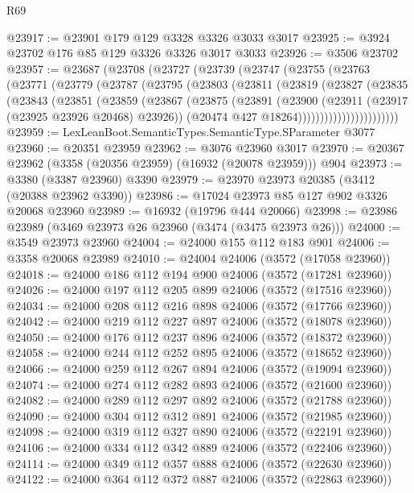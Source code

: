 \begin{lexlean}{R69}
\begin{coremodule}
@23917 := @23901 @179 @129 @3328 @3326 @3033 @3017
@23925 := @3924 @23702 @176 @85 @129 @3326 @3326 @3017 @3033
@23926 := @3506 @23702
@23957 := @23687
    (@23708
      (@23727
        (@23739
          (@23747
            (@23755
              (@23763
                (@23771
                  (@23779
                    (@23787
                      (@23795
                        (@23803
                          (@23811
                            (@23819
                              (@23827
                                (@23835
                                  (@23843
                                    (@23851
                                      (@23859
                                        (@23867
                                          (@23875
                                            (@23891
                                              (@23900
                                                (@23911 (@23917 (@23925 @23926 @20468) @23926))
                                                (@20474 @427 @18264)))))))))))))))))))))))
@23959 := LexLeanBoot.SemanticTypes.SemanticType.SParameter @3077
@23960 := @20351 @23959
@23962 := @3076 @23960 @3017
@23970 := @20367 @23962 (@3358 (@20356 @23959) (@16932 (@20078 @23959))) @904
@23973 := @3380 (@3387 @23960) @3390
@23979 := @23970 @23973 @20385 (@3412 (@20388 @23962 @3390))
@23986 := @17024 @23973 @85 @127 @902 @3326 @20068 @23960
@23989 := @16932 (@19796 @444 @20066)
@23998 := @23986 @23989 (@3469 @23973 @26 @23960 (@3474 (@3475 @23973 @26)))
@24000 := @3549 @23973 @23960
@24004 := @24000 @155 @112 @183 @901
@24006 := @3358 @20068 @23989
@24010 := @24004 @24006 (@3572 (@17058 @23960))
@24018 := @24000 @186 @112 @194 @900 @24006 (@3572 (@17281 @23960))
@24026 := @24000 @197 @112 @205 @899 @24006 (@3572 (@17516 @23960))
@24034 := @24000 @208 @112 @216 @898 @24006 (@3572 (@17766 @23960))
@24042 := @24000 @219 @112 @227 @897 @24006 (@3572 (@18078 @23960))
@24050 := @24000 @176 @112 @237 @896 @24006 (@3572 (@18372 @23960))
@24058 := @24000 @244 @112 @252 @895 @24006 (@3572 (@18652 @23960))
@24066 := @24000 @259 @112 @267 @894 @24006 (@3572 (@19094 @23960))
@24074 := @24000 @274 @112 @282 @893 @24006 (@3572 (@21600 @23960))
@24082 := @24000 @289 @112 @297 @892 @24006 (@3572 (@21788 @23960))
@24090 := @24000 @304 @112 @312 @891 @24006 (@3572 (@21985 @23960))
@24098 := @24000 @319 @112 @327 @890 @24006 (@3572 (@22191 @23960))
@24106 := @24000 @334 @112 @342 @889 @24006 (@3572 (@22406 @23960))
@24114 := @24000 @349 @112 @357 @888 @24006 (@3572 (@22630 @23960))
@24122 := @24000 @364 @112 @372 @887 @24006 (@3572 (@22863 @23960))

\end{coremodule}
\end{lexlean}
